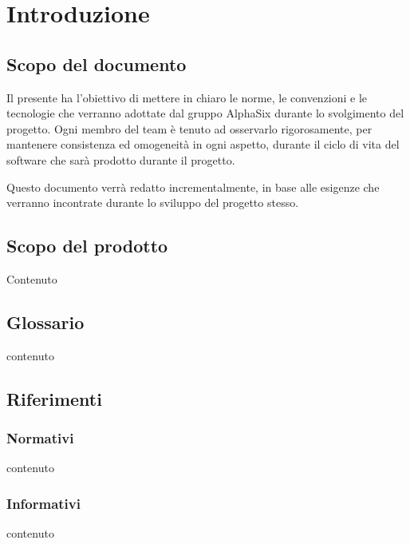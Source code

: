 \section{Introduzione}

\subsection{Scopo del documento}
    Il presente  ha l’obiettivo di mettere in chiaro le norme, le convenzioni e le tecnologie
    che verranno adottate dal gruppo AlphaSix durante lo svolgimento del progetto\GAlt. Ogni membro del team
    \`e tenuto ad osservarlo rigorosamente, per mantenere consistenza ed omogeneit\`a in ogni aspetto, durante il ciclo di
    vita del software che sarà prodotto durante il progetto.\par
    Questo documento verr\`a redatto incrementalmente, in base alle esigenze che verranno incontrate durante lo sviluppo del
    progetto stesso.

\subsection{Scopo del prodotto}
    Contenuto

\subsection{Glossario}
    contenuto

\subsection{Riferimenti}

    \subsubsection{Normativi}
        contenuto

    \subsubsection{Informativi}
        contenuto
